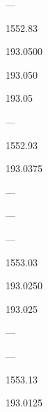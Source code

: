\documentclass[letterpaper,10pt,english]{sphinxmanual}
\begin{document}
—





1552.83









193.0500





193.050





193.05





—





1552.93









193.0375





—





—





—





1553.03









193.0250





193.025





—





—





1553.13









193.0125
\end{document}
